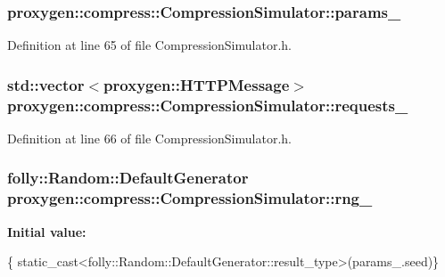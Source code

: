 \subsubsection[{params\+\_\+}]{ proxygen\+::compress\+::\+Compression\+Simulator\+::params\+\_\+\hspace{0.3cm}{\ttfamily [private]}}\label{classproxygen_1_1compress_1_1CompressionSimulator_a9513db1985327332e7a9e87f708fa899}


Definition at line 65 of file Compression\+Simulator.\+h.

\subsubsection[{requests\+\_\+}]{\setlength{\rightskip}{0pt plus 5cm}std\+::vector$<${\bf proxygen\+::\+H\+T\+T\+P\+Message}$>$ proxygen\+::compress\+::\+Compression\+Simulator\+::requests\+\_\+\hspace{0.3cm}{\ttfamily [private]}}\label{classproxygen_1_1compress_1_1CompressionSimulator_ad3715b92b4caff88ff3cf9ca77f954b7}


Definition at line 66 of file Compression\+Simulator.\+h.

\subsubsection[{rng\+\_\+}]{\setlength{\rightskip}{0pt plus 5cm}folly\+::\+Random\+::\+Default\+Generator proxygen\+::compress\+::\+Compression\+Simulator\+::rng\+\_\+\hspace{0.3cm}{\ttfamily [private]}}\label{classproxygen_1_1compress_1_1CompressionSimulator_ae668782e2b26f9ca6dd1cd8f5c6d5cc7}
{\bfseries Initial value\+:}
\begin{DoxyCode}
\{
      \textcolor{keyword}{static\_cast<}folly::Random::DefaultGenerator::result\_type\textcolor{keyword}{>}(params_.seed)\}
\end{DoxyCode}


